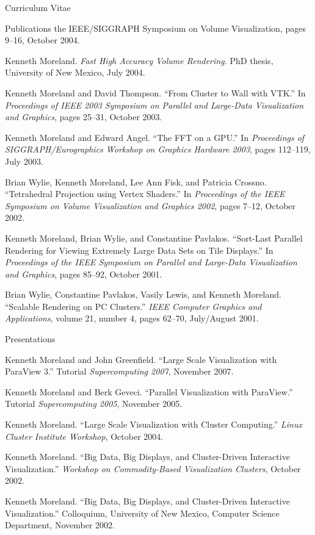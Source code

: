\documentclass{article}
\begin{document}
\begin{cv}{Curriculum Vitae}
\begin{cvlist}{Publications}
{        the IEEE/SIGGRAPH Symposium on Volume Visualization}, pages 9--16,
      October 2004.
    \item Kenneth Moreland.  \emph{Fast High Accuracy Volume Rendering.}
      PhD thesis, University of New Mexico, July 2004.
    \item Kenneth Moreland and David Thompson.  ``From Cluster to Wall
      with VTK.''  In \emph{Proceedings of IEEE 2003 Symposium on
      Parallel and Large-Data Visualization and Graphics}, pages 25--31,
      October 2003.
    \item Kenneth Moreland and Edward Angel.  ``The FFT on a GPU.''  In
      \emph{Proceedings of SIGGRAPH/Eurographics Workshop on Graphics
      Hardware 2003}, pages 112--119, July 2003.
    \item Brian Wylie, Kenneth Moreland, Lee Ann Fisk, and Patricia
      Crossno.  ``Tetrahedral Projection using Vertex Shaders.''  In
      \emph{Proceedings of the IEEE Symposium on Volume Visualization and
      Graphics 2002}, pages 7--12, October 2002.
    \item Kenneth Moreland, Brian Wylie, and Constantine Pavlakos.
      ``Sort-Last Parallel Rendering for Viewing Extremely Large Data
      Sets on Tile Displays.''  In \emph{Proceedings of the IEEE
      Symposium on Parallel and Large-Data Visualization and Graphics},
      pages 85--92, October 2001.
    \item Brian Wylie, Constantine Pavlakos, Vasily Lewis, and Kenneth
      Moreland.  ``Scalable Rendering on PC Clusters.''  \emph{IEEE
      Computer Graphics and Applications}, volume 21, number 4, pages
      62--70, July/August 2001.
    \end{cvlist}

    \begin{cvlist}{Presentations}
    \item Kenneth Moreland and John Greenfield.  ``Large Scale
      Visualization with ParaView 3.''  Tutorial \emph{Supercomputing
      2007}, November 2007.
    \item Kenneth Moreland and Berk Geveci.  ``Parallel Visualization
      with ParaView.''  Tutorial \emph{Supercomputing 2005}, November
      2005.
    \item Kenneth Moreland.  ``Large Scale Visualization with Cluster
      Computing.''  \emph{Linux Cluster Institute Workshop}, October
      2004.
    \item Kenneth Moreland.  ``Big Data, Big Displays, and Cluster-Driven
      Interactive Visualization.''  \emph{Workshop on Commodity-Based
      Visualization Clusters}, October 2002.
    \item Kenneth Moreland.  ``Big Data, Big Displays, and Cluster-Driven
      Interactive Visualization.''  Colloquium, University of New Mexico,
      Computer Science Department, November 2002.
    \end{cvlist}


\end{cv}
\end{document}
